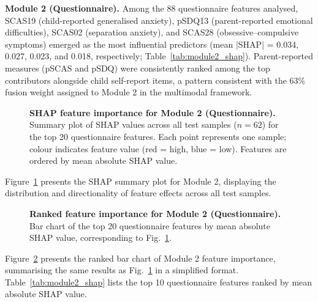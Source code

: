 \documentclass[10pt,letterpaper]{article}
\newcommand{\hlpar}[1]{\leavevmode\colorbox{yellow!30}{\parbox{\dimexpr\linewidth-2\fboxsep\relax}{#1}}\vspace{2pt}}
\begin{document}
\hlpar{\textbf{Module 2 (Questionnaire).} Among the 88 questionnaire features analysed, SCAS19 (child-reported generalised anxiety), pSDQ13 (parent-reported emotional difficulties), SCAS02 (separation anxiety), and SCAS28 (obsessive--compulsive symptoms) emerged as the most influential predictors (mean $|\mathrm{SHAP}|$ = 0.034, 0.027, 0.023, and 0.018, respectively; Table~\ref{tab:module2_shap}). Parent-reported measures (pSCAS and pSDQ) were consistently ranked among the top contributors alongside child self-report items, a pattern consistent with the 63\% fusion weight assigned to Module 2 in the multimodal framework.}

\begin{figure}[!ht]
\caption{\textbf{SHAP feature importance for Module 2 (Questionnaire).} Summary plot of SHAP values across all test samples ($n=62$) for the top 20 questionnaire features. Each point represents one sample; colour indicates feature value (red = high, blue = low). Features are ordered by mean absolute SHAP value.}
\label{fig:module2_shap_summary}
\end{figure}

\hlpar{Figure~\ref{fig:module2_shap_summary} presents the SHAP summary plot for Module 2, displaying the distribution and directionality of feature effects across all test samples.}

\begin{figure}[!ht]
\caption{\textbf{Ranked feature importance for Module 2 (Questionnaire).} Bar chart of the top 20 questionnaire features by mean absolute SHAP value, corresponding to Fig.~\ref{fig:module2_shap_summary}.}
\label{fig:module2_bar}
\end{figure}

\hlpar{Figure~\ref{fig:module2_bar} presents the ranked bar chart of Module 2 feature importance, summarising the same results as Fig.~\ref{fig:module2_shap_summary} in a simplified format. Table~\ref{tab:module2_shap} lists the top 10 questionnaire features ranked by mean absolute SHAP value.}
\end{document}
